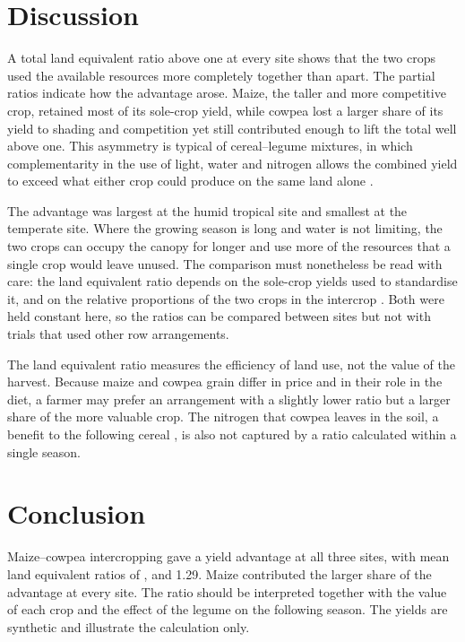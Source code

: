 \section{Discussion}

A total land equivalent ratio above one at every site shows that the two
crops used the available resources more completely together than apart. The
partial ratios indicate how the advantage arose. Maize, the taller and more
competitive crop, retained most of its sole-crop yield, while cowpea lost a
larger share of its yield to shading and competition yet still contributed
enough to lift the total well above one. This asymmetry is typical of
cereal--legume mixtures, in which complementarity in the use of light,
water and nitrogen allows the combined yield to exceed what either crop could
produce on the same land alone \parencite{brooker2015}.

The advantage was largest at the humid tropical site and smallest at the
temperate site. Where the growing season is long and water is not limiting,
the two crops can occupy the canopy for longer and use more of the resources
that a single crop would leave unused. The comparison must nonetheless be read
with care: the land equivalent ratio depends on the sole-crop yields used to
standardise it, and on the relative proportions of the two crops in the
intercrop \parencite{mead1980}. Both were held constant here, so the ratios
can be compared between sites but not with trials that used other row
arrangements.

The land equivalent ratio measures the efficiency of land use, not the value
of the harvest. Because maize and cowpea grain differ in price and in their
role in the diet, a farmer may prefer an arrangement with a slightly lower
ratio but a larger share of the more valuable crop. The nitrogen that cowpea
leaves in the soil, a benefit to the following cereal \parencite{vanlauwe2010},
is also not captured by a ratio calculated within a single season.

\section{Conclusion}

Maize--cowpea intercropping gave a yield advantage at all three sites, with
mean land equivalent ratios of ,  and
1.29. Maize contributed the larger share of the advantage at every
site. The ratio should be interpreted together with the value of each crop and
the effect of the legume on the following season. The yields are synthetic
and illustrate the calculation only.
